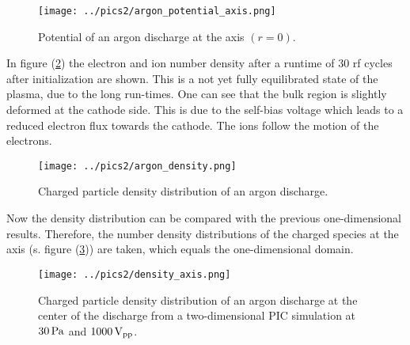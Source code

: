 \begin{figure}[htbp]
    \centering
    \texttt{[image: ../pics2/argon\_potential\_axis.png]}
    \caption{Potential of an argon discharge at the axis $(r=0)$. }
    \label{fig:potential_argon2}
\end{figure}

In figure (\ref{fig:dens_argon}) the electron and ion number density after a runtime of 30 rf cycles after initialization are shown.
This is a not yet fully equilibrated state of the plasma, due to the long run-times.
One can see that the bulk region is slightly deformed at the cathode side.
This is due to the self-bias voltage which leads to a reduced electron flux towards the cathode.
The ions follow the motion of the electrons.

\begin{figure}[htbp]
    \centering
    \texttt{[image: ../pics2/argon\_density.png]}
    \caption{Charged particle density distribution of an argon discharge.}
    \label{fig:dens_argon}
\end{figure}
Now the density distribution can be compared with the previous one-dimensional results.
Therefore, the number density distributions of the charged species at the axis (s. figure (\ref{fig:dens_axis_argon})) are taken, which equals the one-dimensional domain.
\begin{figure}[htbp]
    \centering
    \texttt{[image: ../pics2/density\_axis.png]}
    \caption{Charged particle density distribution of an argon discharge at the center of the discharge from a two-dimensional PIC simulation at $30\,\mathrm{Pa}$ and $1000\,\mathrm{V_{pp}}$.}
    \label{fig:dens_axis_argon}
\end{figure}

